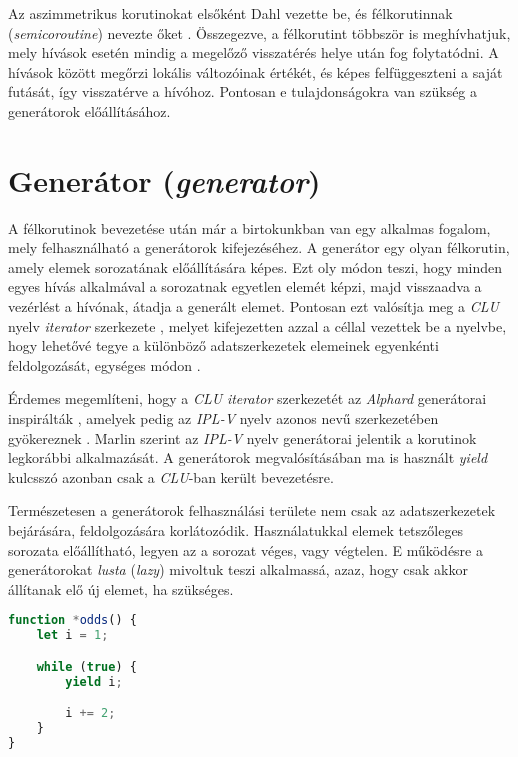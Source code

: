 Az aszimmetrikus korutinokat elsőként Dahl vezette be, és félkorutinnak (\textit{semicoroutine}) nevezte őket . Összegezve, a félkorutint többször is meghívhatjuk, mely hívások esetén mindig a megelőző visszatérés helye után fog folytatódni. A hívások között megőrzi lokális változóinak értékét, és képes felfüggeszteni a saját futását, így visszatérve a hívóhoz. Pontosan e tulajdonságokra van szükség a generátorok előállításához.

\section{Generátor (\textit{generator})}

A félkorutinok bevezetése után már a birtokunkban van egy alkalmas fogalom, mely felhasználható a generátorok kifejezéséhez. A generátor egy olyan félkorutin, amely elemek sorozatának előállítására képes. Ezt oly módon teszi, hogy minden egyes hívás alkalmával a sorozatnak egyetlen elemét képzi, majd visszaadva a vezérlést a hívónak, átadja a generált elemet. Pontosan ezt valósítja meg a \textit{CLU} nyelv \textit{iterator} szerkezete \cite{CLUManual}, melyet kifejezetten azzal a céllal vezettek be a nyelvbe, hogy lehetővé tegye a különböző adatszerkezetek elemeinek egyenkénti feldolgozását, egységes módon \cite{CLUHistory}.

Érdemes megemlíteni, hogy a \textit{CLU} \textit{iterator} szerkezetét az \textit{Alphard} generátorai inspirálták \cite{CLUHistory}, amelyek pedig az \textit{IPL-V} nyelv azonos nevű szerkezetében gyökereznek . Marlin \citeyear{Marlin1980} szerint az \textit{IPL-V} nyelv generátorai jelentik a korutinok legkorábbi alkalmazását. A generátorok megvalósításában ma is használt \textit{yield} kulcsszó azonban csak a \textit{CLU}-ban került bevezetésre.

Természetesen a generátorok felhasználási területe nem csak az adatszerkezetek bejárására, feldolgozására korlátozódik. Használatukkal elemek tetszőleges sorozata előállítható, legyen az a sorozat véges, vagy végtelen. E működésre a generátorokat \textit{lusta} (\textit{lazy}) mivoltuk teszi alkalmassá, azaz, hogy csak akkor állítanak elő új elemet, ha szükséges.

\begin{lstlisting}[language=JavaScript, caption={Páratlan számok végtelen sorozatát előállító generátor JavaScriptben}, captionpos=b, label=JSGenOdds]
function *odds() {
    let i = 1;

    while (true) {
        yield i;

        i += 2;
    }
}
\end{lstlisting}

